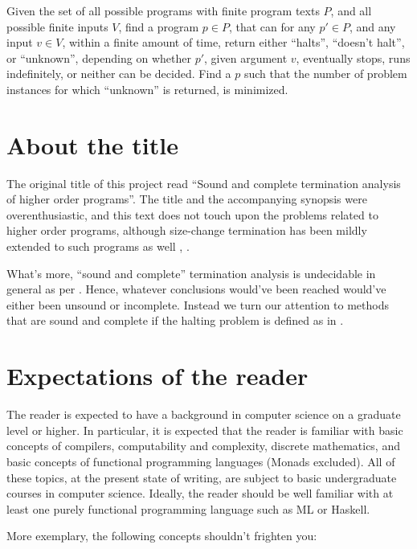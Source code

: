 \begin{definition}\label{definition:halting-2} Given the set of all possible
programs with finite program texts $P$, and all possible finite inputs $V$,
find a program $p\in P$, that can for any $p'\in P$, and any input $v\in V$,
within a finite amount of time, return either ``halts'', ``doesn't halt'', or
``unknown'', depending on whether $p'$, given argument $v$, eventually stops,
runs indefinitely, or neither can be decided. Find a $p$ such that the number
of problem instances for which ``unknown'' is returned, is
minimized.\end{definition}

\section{About the title}

The original title of this project read ``Sound and complete termination
analysis of higher order programs''. The title and the accompanying synopsis
were overenthusiastic, and this text does not touch upon the problems related
to higher order programs, although size-change termination has been mildly
extended to such programs as well \cite{sct-untyped-lambda},
\cite{sct-higher-order}.

What's more, ``sound and complete'' termination analysis is undecidable in
general as per . Hence, whatever conclusions
would've been reached would've either been unsound or incomplete. Instead we
turn our attention to methods that are sound and complete if the halting
problem is defined as in .

\section{Expectations of the reader}

The reader is expected to have a background in computer science on a graduate
level or higher. In particular, it is expected that the reader is familiar with
basic concepts of compilers, computability and complexity, discrete
mathematics, and basic concepts of functional programming languages (Monads
excluded). All of these topics, at the present state of writing, are subject to
basic undergraduate courses in computer science. Ideally, the reader should be
well familiar with at least one purely functional programming language such as
ML or Haskell.

More exemplary, the following concepts shouldn't frighten you:

